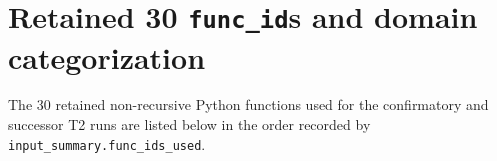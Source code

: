 %

\section{Retained 30 \texttt{func\_id}s and domain categorization}
\label{app:A}

The 30 retained non-recursive Python functions used for the confirmatory and
successor T2 runs are listed below in the order recorded by
\texttt{input\_summary.func\_ids\_used}.

